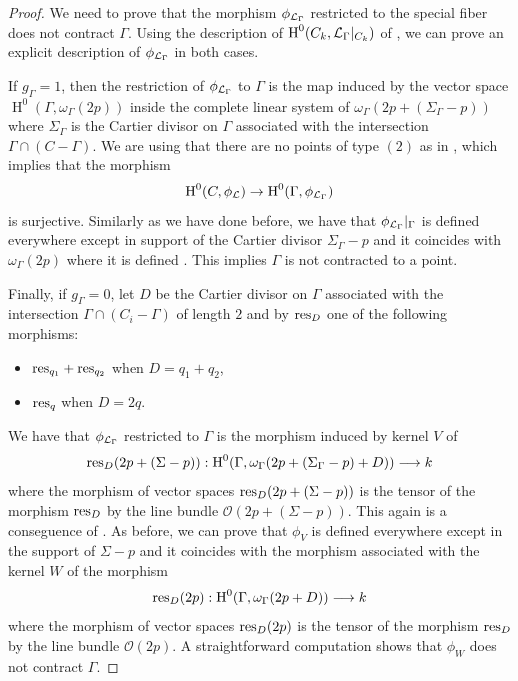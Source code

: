 \documentclass{alggeom}
\numberwithin{equation}{section}
\numberwithin{subsection}{section}
\theoremstyle{definition}
\theoremstyle{remark}
\newcommand\cO{\mathcal{O}} \newcommand\cP{\mathcal{P}}
\renewcommand\H{\operatorname{H}}
\begin{document}
\begin{proof} 
	We need to prove that the morphism $\phi_{\mathcal{L}_{\Gamma}}$ restricted to the special fiber does not contract $\Gamma$. Using the description of $\H^0(C_k,\cL_{\Gamma}\vert_{C_k})$ of , we can prove an explicit description of $\phi_{\mathcal{L}_{\Gamma}}$ in both cases. 
	
	If $g_{\Gamma}=1$, then the restriction of $\phi_{\mathcal{L}_{\Gamma}}$ to $\Gamma$ is the map induced by the vector space $\H^0(\Gamma,\omega_{\Gamma}(2p))$ inside the complete linear system of $\omega_{\Gamma}(2p + (\Sigma_{\Gamma}-p))$ where $\Sigma_{\Gamma}$ is the Cartier divisor on $\Gamma$ associated with the intersection $\Gamma \cap (C-\Gamma)$. We are using that there are no points of type $(2)$ as in , which implies that the morphism 
	$$ \H^0(C,\phi_{\cL}) \rightarrow \H^0(\Gamma,\phi_{\cL_{\Gamma}})$$
	is surjective. Similarly as we have done before, we have that $\phi_{\mathcal{L}_{\Gamma}}\vert_{\Gamma}$ is defined everywhere except in support of the Cartier divisor $\Sigma_{\Gamma}-p$ and it coincides with $\omega_{\Gamma}(2p)$ where it is defined . This implies $\Gamma$ is not contracted to a point. 
	
	Finally, if $g_{\Gamma}=0$, let $D$ be the Cartier divisor on $\Gamma$ associated with the intersection $\Gamma\cap(C_i-\Gamma)$ of length $2$ and by ${\rm res}_D$ one of the following morphisms: 
	\begin{itemize}
		\item ${\rm res}_{q_1}+{\rm res}_{q_2}$ when $D=q_1+q_2$, 
		\item ${\rm res}_q$ when $D=2q$.
	\end{itemize}
	We have that $\phi_{\mathcal{L}_{\Gamma}}$ restricted to $\Gamma$ is the morphism induced by kernel $V$ of 
	$$ {\rm res}_{D}(2p+(\Sigma-p)):\H^0(\Gamma,\omega_{\Gamma}(2p+(\Sigma_{\Gamma}-p)+D)) \longrightarrow k$$
    where the morphism of vector spaces ${\rm res}_{D}(2p+(\Sigma-p))$ is the tensor of the morphism ${\rm res}_D$ by the line bundle $\cO(2p+(\Sigma-p))$. This again is a conseguence of . As before, we can prove that $\phi_V$ is defined everywhere except in the support of $\Sigma-p$ and it coincides with the morphism associated with the kernel $W$ of the morphism 
    $$ {\rm res}_{D}(2p):\H^0(\Gamma,\omega_{\Gamma}(2p+D)) \longrightarrow k$$
	where the morphism of vector spaces ${\rm res}_{D}(2p)$ is the tensor of the morphism ${\rm res}_D$ by the line bundle $\cO(2p)$. A straightforward computation shows that $\phi_W$ does not contract $\Gamma$.
\end{proof}
\end{document}
